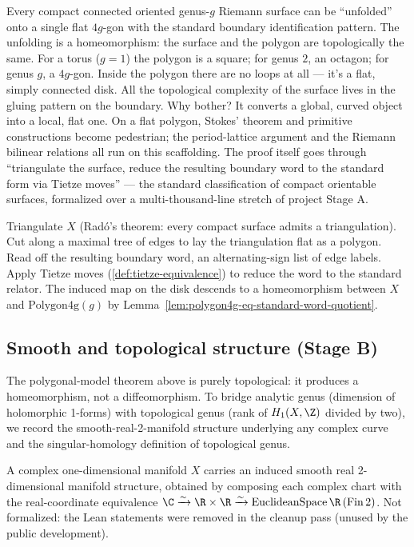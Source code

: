 \begin{layman}
Every compact connected oriented genus-\(g\) Riemann surface can be
``unfolded'' onto a single flat \(4g\)-gon with the standard boundary
identification pattern. The unfolding is a homeomorphism: the surface
and the polygon are topologically the same. For a torus (\(g=1\))
the polygon is a square; for genus \(2\), an octagon; for genus
\(g\), a \(4g\)-gon. Inside the polygon there are no loops at all ---
it's a flat, simply connected disk. All the topological complexity
of the surface lives in the gluing pattern on the boundary. Why
bother? It converts a global, curved object into a local, flat one.
On a flat polygon, Stokes' theorem and primitive constructions
become pedestrian; the period-lattice argument and the Riemann
bilinear relations all run on this scaffolding. The proof itself
goes through ``triangulate the surface, reduce the resulting boundary
word to the standard form via Tietze moves'' --- the standard
classification of compact orientable surfaces, formalized over a
multi-thousand-line stretch of project Stage A.
\end{layman}

\begin{proofsketch}
Triangulate \(X\) (Rad\'o's theorem: every compact surface admits a
triangulation). Cut along a maximal tree of edges to lay the
triangulation flat as a polygon. Read off the resulting boundary
word, an alternating-sign list of edge labels. Apply Tietze moves
(\ref{def:tietze-equivalence}) to reduce the word to the standard
relator. The induced map on the disk descends to a homeomorphism
between \(X\) and \(\mathrm{Polygon4g}(g)\) by
Lemma~\ref{lem:polygon4g-eq-standard-word-quotient}.
\end{proofsketch}

\subsection{Smooth and topological structure (Stage B)}

The polygonal-model theorem above is purely topological: it produces
a homeomorphism, not a diffeomorphism. To bridge analytic genus
(dimension of holomorphic 1-forms) with topological genus (rank of
\(H_1(X,\Z)\) divided by two), we record the smooth-real-2-manifold
structure underlying any complex curve and the singular-homology
definition of topological genus.

\begin{definition}
\label{def:smooth-real-structure}
A complex one-dimensional manifold \(X\) carries an induced smooth
real 2-dimensional manifold structure, obtained by composing each
complex chart with the real-coordinate equivalence
\(\C \xrightarrow{\sim} \R\times\R \xrightarrow{\sim}
\mathrm{EuclideanSpace}\,\R\,(\mathrm{Fin}\,2)\).
Not formalized: the Lean statements were removed in the cleanup pass (unused by the public development).
\end{definition}

